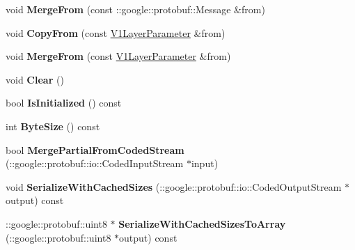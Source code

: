 \begin{DoxyCompactItemize}
\mbox{\label{classcaffe_1_1_v1_layer_parameter_ad04f3b2afc9ea59f2eb6cf7ec36b2a20}} 
void {\bfseries Merge\+From} (const \+::google\+::protobuf\+::\+Message \&from)
\item 
\mbox{\label{classcaffe_1_1_v1_layer_parameter_a14f0eece97303690418870e7f6b1e314}} 
void {\bfseries Copy\+From} (const \mbox{\hyperlink{classcaffe_1_1_v1_layer_parameter}{V1\+Layer\+Parameter}} \&from)
\item 
\mbox{\label{classcaffe_1_1_v1_layer_parameter_a0a493f491ef61b195f84e75cf259fc32}} 
void {\bfseries Merge\+From} (const \mbox{\hyperlink{classcaffe_1_1_v1_layer_parameter}{V1\+Layer\+Parameter}} \&from)
\item 
\mbox{\label{classcaffe_1_1_v1_layer_parameter_aa6e1788f223292e709884152967a0559}} 
void {\bfseries Clear} ()
\item 
\mbox{\label{classcaffe_1_1_v1_layer_parameter_a51e56d08cf44f154a7ede653f8faffc9}} 
bool {\bfseries Is\+Initialized} () const
\item 
\mbox{\label{classcaffe_1_1_v1_layer_parameter_aab041ba88abef2282e1a9bc83020ec28}} 
int {\bfseries Byte\+Size} () const
\item 
\mbox{\label{classcaffe_1_1_v1_layer_parameter_a28eab0fc2435eb8a419276ddc5eeba6b}} 
bool {\bfseries Merge\+Partial\+From\+Coded\+Stream} (\+::google\+::protobuf\+::io\+::\+Coded\+Input\+Stream $\ast$input)
\item 
\mbox{\label{classcaffe_1_1_v1_layer_parameter_a85b31f89e7c91cdfbeef4acab061ca67}} 
void {\bfseries Serialize\+With\+Cached\+Sizes} (\+::google\+::protobuf\+::io\+::\+Coded\+Output\+Stream $\ast$output) const
\item 
\mbox{\label{classcaffe_1_1_v1_layer_parameter_aaa45bf29e9492f84983b0be255119d08}} 
\+::google\+::protobuf\+::uint8 $\ast$ {\bfseries Serialize\+With\+Cached\+Sizes\+To\+Array} (\+::google\+::protobuf\+::uint8 $\ast$output) const

\end{DoxyCompactItemize}
